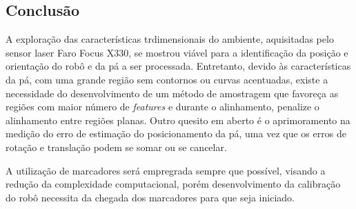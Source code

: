 \subsection{Conclusão}

A exploração das características trdimensionais do ambiente,
aquisitadas pelo sensor laser Faro Focus X330, se mostrou viável para a identificação da posição
e orientação do robô e da pá a ser processada. Entretanto, devido às
características da pá, com uma grande região sem contornos ou curvas acentuadas,
existe a necessidade do desenvolvimento de um método de amostragem que favoreça as regiões com maior número de \textit{features} e durante o
alinhamento, penalize o alinhamento entre regiões planas. Outro quesito em
aberto é o aprimoramento na medição do erro de estimação do posicionamento da
pá, uma vez que os erros de rotação e translação podem se somar ou se cancelar.

A utilização de marcadores será empregrada sempre que possível, visando a
redução da complexidade computacional, porém desenvolvimento da calibração do
robô necessita da chegada dos marcadores para que seja iniciado.




